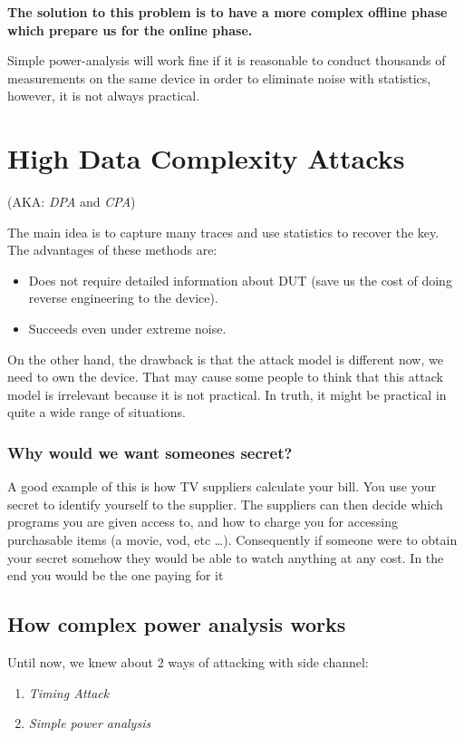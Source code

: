\textbf{The solution to this problem is to have a more complex offline phase which prepare us for the online phase.}

Simple power-analysis will work fine if it is reasonable to conduct thousands of measurements on the same device in order to eliminate noise with statistics, however, it is not always practical.

\section{High Data Complexity Attacks}

(AKA: \textit{DPA} and \textit{CPA})

The main idea is to capture many traces and use statistics to recover the key.
The advantages of these methods are:
\begin{itemize}
    \item Does not require detailed information about DUT (save us the cost of doing reverse engineering to the device).
    \item Succeeds even under extreme noise.
\end{itemize}

On the other hand, the drawback is that the attack model is different now, we need to own the device. 
That may cause some people to think that this attack model is irrelevant because it is not practical. 
In truth, it might be practical in quite a wide range of situations.


\subsubsection{Why would we want someones secret?}

A good example of this is how TV suppliers calculate your bill.
You use your secret to identify yourself to the supplier. The suppliers can then decide which programs you are given access to, and how to charge you for accessing purchasable items (a movie, vod, etc \ldots). 
Consequently if someone were to obtain your secret somehow they would be able to watch anything at any cost. In the end you would be the one paying for it

\subsection{How complex power analysis works}

Until now, we knew about 2 ways of attacking with side channel:
\begin{enumerate}
    \item \textit{Timing Attack}
    \item \textit{Simple power analysis}
\end{enumerate}

